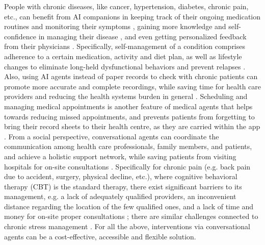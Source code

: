 People with chronic diseases, like cancer, hypertension, diabetes, chronic pain, etc., can benefit from AI companions in keeping track of their ongoing medication routines and monitoring their symptoms \cite{CAsinhealthsurvey2019, vik2020, asthma2014, machinesinmentalhealth2017, max2021, GoogleHomediabetes2018}, gaining more knowledge and self-confidence in managing their disease \cite{asthma2014, stress2017}, and even getting personalized feedback from their physicians \cite{max2021}. Specifically, self-management of a condition comprises adherence to a certain medication, activity and diet plan, as well as lifestyle changes to eliminate long-held dysfunctional behaviors and prevent relapses \cite{hudlicka2013, stress2017, selma2020}. Also, using AI agents instead of paper records to check with chronic patients can promote more accurate and complete recordings, while saving time for health care providers \cite{17thIEEESymposium2004, childhoodobesity2017, tensiobot2021} and reducing the health systems burden in general \cite{mydiabetescoach2020}. Scheduling and managing medical appointments is another feature of medical agents that helps towards reducing missed appointments, and prevents patients from forgetting to bring their record sheets to their health centre, as they are carried within the app \cite{tensiobot2021}. From a social perspective, conversational agents can coordinate the communication among health care professionals, family members, and patients, and achieve a holistic support network, while saving patients from visiting hospitals for on-site consultations \cite{childhoodobesity2017, max2021}. Specifically for chronic pain (e.g. back pain due to accident, surgery, physical decline, etc.), where cognitive behavioral therapy (CBT) is the standard therapy, there exist significant barriers to its management, e.g. a lack of adequately qualified providers, an inconvenient distance regarding the location of the few qualified ones, and a lack of time and money for on-site proper consultations \cite{selma2020}; there are similar challenges connected to chronic stress management \cite{hudlicka2013, stress2017}. For all the above, interventions via conversational agents can be a cost-effective, accessible and flexible solution.

